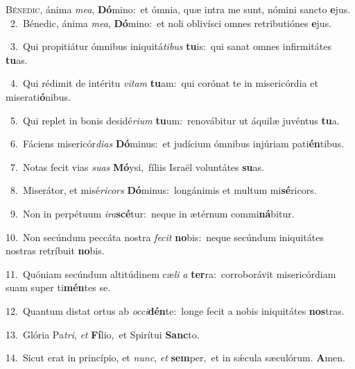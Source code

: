 \lettrine{\initial\textcolor{\initialcolor}{B}}{énedic,} ánima \textit{me}\-\textit{a}, \textbf{Dó}\-mino:~\star et ómnia, quæ intra me sunt, nómini sancto \textbf{e}\-jus.\\
{\numbfont\textcolor{\numbcolor}{~2.}}~Bénedic, ánima \textit{me}\-\textit{a}, \textbf{Dó}\-mino:~\star et noli oblivísci omnes retributiónes \textbf{e}\-jus.\par
{\numbfont\textcolor{\numbcolor}{~3.}}~Qui propitiátur ómnibus iniquitá\-\textit{ti}\-\textit{bus} \textbf{tu}\-is:~\star qui sanat omnes infirmitátes \textbf{tu}\-as.\par
{\numbfont\textcolor{\numbcolor}{~4.}}~Qui rédimit de intéritu \textit{vi}\-\textit{tam} \textbf{tu}\-am:~\star qui corónat te in misericórdia et miserati\-\textbf{ó}\-nibus.\par
{\numbfont\textcolor{\numbcolor}{~5.}}~Qui replet in bonis desidé\-\textit{ri}\-\textit{um} \textbf{tu}\-um:~\star renovábitur ut áquilæ juvéntus \textbf{tu}\-a.\par
{\numbfont\textcolor{\numbcolor}{~6.}}~Fáciens misericór\-\textit{di}\-\textit{as} \textbf{Dó}\-minus:~\star et judícium ómnibus injúriam pati\-\textbf{én}\-tibus.\par
{\numbfont\textcolor{\numbcolor}{~7.}}~Notas fecit vias \textit{su}\-\textit{as} \textbf{Mó}\-ysi,~\star fíliis Israël voluntátes \textbf{su}\-as.\par
{\numbfont\textcolor{\numbcolor}{~8.}}~Miserátor, et misé\-\textit{ri}\-\textit{cors} \textbf{Dó}\-minus:~\star longánimis et multum mi\-\textbf{sé}\-ricors.\par
{\numbfont\textcolor{\numbcolor}{~9.}}~Non in perpétuum \textit{i}\-\textit{ra}\textbf{scé}tur:~\star neque in ætérnum commi\-\textbf{ná}\-bitur.\par
{\numbfont\textcolor{\numbcolor}{10.}}~Non secúndum peccáta nostra \textit{fe}\-\textit{cit} \textbf{no}\-bis:~\star neque secúndum iniquitátes nostras retríbuit \textbf{no}\-bis.\par
{\numbfont\textcolor{\numbcolor}{11.}}~Quóniam secúndum altitúdinem cæ\textit{li} \textit{a} \textbf{ter}\-ra:~\star corroborávit misericórdiam suam super ti\-\textbf{mén}\-tes se.\par
{\numbfont\textcolor{\numbcolor}{12.}}~Quantum distat ortus ab \textit{oc}\-\textit{ci}\textbf{dén}te:~\star longe fecit a nobis iniquitátes \textbf{nos}\-tras.\par
{\numbfont\textcolor{\numbcolor}{13.}}~Glória Pa\-\textit{tri}\-, \textit{et} \textbf{Fí}\-lio,~\star et Spirítui \textbf{Sanc}\-to.\par
{\numbfont\textcolor{\numbcolor}{14.}}~Sicut erat in princípio, et \textit{nunc}\-, \textit{et} \textbf{sem}\-per,~\star et in sǽcula sæculórum. \textbf{A}\-men.\par
